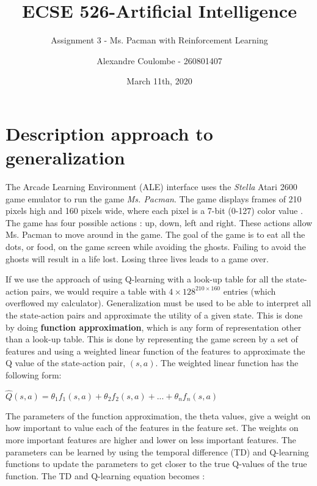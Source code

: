 \documentclass[11pt]{scrartcl}
\begin{document}
\title{ECSE 526-Artificial Intelligence}
\subtitle{Assignment 3 - Ms. Pacman with Reinforcement Learning}
\author{Alexandre Coulombe - 260801407}
\date{March 11th, 2020}
\maketitle

\section{Description approach to generalization}

The Arcade Learning Environment (ALE) interface uses the \textit{Stella} Atari 2600 game emulator to run the game \textit{Ms. Pacman}. The game displays frames of 210 pixels high and 160 pixels wide, where each pixel is a 7-bit (0-127) color value \cite{bellemare13arcade}. The game has four possible actions : up, down, left and right. These actions allow Ms. Pacman to move around in the game. The goal of the game is to eat all the dots, or food, on the game screen while avoiding the ghosts. Failing to avoid the ghosts will result in a life lost. Losing three lives leads to a game over. 

If we use the approach of using Q-learning with a look-up table for all the state-action pairs, we would require a table with $4\times128^{210\times160}$ entries (which overflowed my calculator). Generalization must be used to be able to interpret all the state-action pairs and approximate the utility of a given state. This is done by doing \textbf{function approximation}, which is any form of representation other than a look-up table. This is done by representing the game screen by a set of features and using a weighted linear function of the features to approximate the Q value of the state-action pair, $(s,a)$. The weighted linear function has the following form:

\begin{center}
$\hat{Q}(s,a) = \theta_1 f_1(s,a) + \theta_2 f_2(s,a)+ ... +\theta_n f_n(s,a)$
\end{center}

The parameters of the function approximation, the theta values, give a weight on how important to value each of the features in the feature set. The weights on more important features are higher and lower on less important features. The parameters can be learned by using the temporal difference (TD) and Q-learning functions to update the parameters to get closer to the true Q-values of the true function. The TD and Q-learning equation becomes : 
\end{document}

